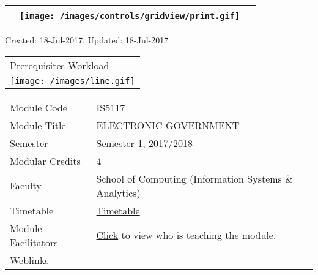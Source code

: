 \hypertarget{ctl00_ctl00_ContentPlaceHolder1_ContentPlaceHolder1_UP}{}
\hypertarget{contentstart}{}
\hypertarget{ctl00_ctl00_ContentPlaceHolder1_ContentPlaceHolder1_pnlMain}{}
\begin{longtable}[]{@{}ll@{}}
\toprule
&
{\href{javascript:PrintThisPage();}{\texttt{[image: /images/controls/gridview/print.gif]}}~~}\tabularnewline
\bottomrule
\end{longtable}

\protect\hypertarget{ctl00_ctl00_ContentPlaceHolder1_ContentPlaceHolder1_LV_UpdateInfo_ctrl0_txtDate}{}{Created:
18-Jul-2017, Updated: 18-Jul-2017}

\begin{longtable}[]{@{}l@{}}
\toprule
\protect\hypertarget{ctl00_ctl00_ContentPlaceHolder1_ContentPlaceHolder1_lblSectionTop}{}{\protect\hyperlink{Prerequisites}{Prerequisites}
\textbar{} \protect\hyperlink{Workload}{Workload}}\tabularnewline
\texttt{[image: /images/line.gif]}\tabularnewline
\bottomrule
\end{longtable}

\hypertarget{ctl00_ctl00_ContentPlaceHolder1_ContentPlaceHolder1_LV_itemPlaceholderContainer}{}
\begin{longtable}[]{@{}ll@{}}
\toprule
\protect\hypertarget{ctl00_ctl00_ContentPlaceHolder1_ContentPlaceHolder1_LV_ctrl0_txtCode}{}{Module
Code} &
\protect\hypertarget{ctl00_ctl00_ContentPlaceHolder1_ContentPlaceHolder1_LV_ctrl0_lcCode}{}{IS5117}\tabularnewline
\protect\hypertarget{ctl00_ctl00_ContentPlaceHolder1_ContentPlaceHolder1_LV_ctrl0_lcCourse}{}{Module
Title} &
\protect\hypertarget{ctl00_ctl00_ContentPlaceHolder1_ContentPlaceHolder1_LV_ctrl0_lcCourseName}{}{ELECTRONIC
GOVERNMENT}\tabularnewline
\protect\hypertarget{ctl00_ctl00_ContentPlaceHolder1_ContentPlaceHolder1_LV_ctrl0_lcSemester}{}{Semester}
&
\protect\hypertarget{ctl00_ctl00_ContentPlaceHolder1_ContentPlaceHolder1_LV_ctrl0_lcSem}{}{Semester
1, 2017/2018}\tabularnewline
\protect\hypertarget{ctl00_ctl00_ContentPlaceHolder1_ContentPlaceHolder1_LV_ctrl0_lcModCredit}{}{Modular
Credits} &
\protect\hypertarget{ctl00_ctl00_ContentPlaceHolder1_ContentPlaceHolder1_LV_ctrl0_lcModC}{}{4}\tabularnewline
\protect\hypertarget{ctl00_ctl00_ContentPlaceHolder1_ContentPlaceHolder1_LV_ctrl0_lcFaculty}{}{Faculty}
&
\protect\hypertarget{ctl00_ctl00_ContentPlaceHolder1_ContentPlaceHolder1_LV_ctrl0_lcFac}{}{School
of Computing (Information Systems \& Analytics)}\tabularnewline
\protect\hypertarget{ctl00_ctl00_ContentPlaceHolder1_ContentPlaceHolder1_LV_ctrl0_Label1}{}{Timetable}
&
\protect\hypertarget{ctl00_ctl00_ContentPlaceHolder1_ContentPlaceHolder1_LV_ctrl0_Span1}{}{\href{javascript:void(0);}{Timetable}}\tabularnewline
\protect\hypertarget{ctl00_ctl00_ContentPlaceHolder1_ContentPlaceHolder1_LV_ctrl0_Label6}{}{Module
Facilitators} &
\protect\hypertarget{ctl00_ctl00_ContentPlaceHolder1_ContentPlaceHolder1_LV_ctrl0_Span2}{}{\href{list_lecturers.aspx?CourseID=c2566e96-8849-42a1-b6e8-36ec6e45867b\&ClickFrom=}{Click}
to view who is teaching the module.}\tabularnewline
\protect\hypertarget{ctl00_ctl00_ContentPlaceHolder1_ContentPlaceHolder1_LV_ctrl0_LabelCtrl1}{}{Weblinks}
&\tabularnewline
\bottomrule
\end{longtable}

